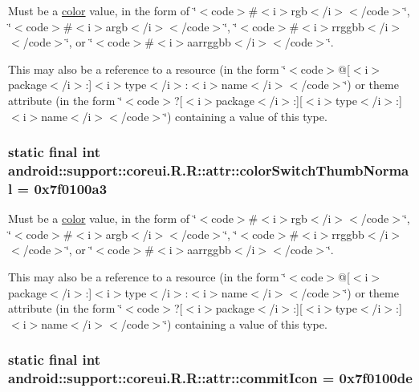 Must be a \hyperlink{classandroid_1_1support_1_1coreui_1_1_r_1_1color}{color} value, in the form of \char`\"{}$<$code$>$\#$<$i$>$rgb$<$/i$>$$<$/code$>$\char`\"{}, \char`\"{}$<$code$>$\#$<$i$>$argb$<$/i$>$$<$/code$>$\char`\"{}, \char`\"{}$<$code$>$\#$<$i$>$rrggbb$<$/i$>$$<$/code$>$\char`\"{}, or \char`\"{}$<$code$>$\#$<$i$>$aarrggbb$<$/i$>$$<$/code$>$\char`\"{}. 

This may also be a reference to a resource (in the form \char`\"{}$<$code$>$@\mbox{[}$<$i$>$package$<$/i$>$:\mbox{]}$<$i$>$type$<$/i$>$:$<$i$>$name$<$/i$>$$<$/code$>$\char`\"{}) or theme attribute (in the form \char`\"{}$<$code$>$?\mbox{[}$<$i$>$package$<$/i$>$:\mbox{]}\mbox{[}$<$i$>$type$<$/i$>$:\mbox{]}$<$i$>$name$<$/i$>$$<$/code$>$\char`\"{}) containing a value of this type. \hypertarget{classandroid_1_1support_1_1coreui_1_1_r_1_1attr_802857b72cbbbf709e4a771bb2261709}{
\subsubsection[{colorSwitchThumbNormal}]{\setlength{\rightskip}{0pt plus 5cm}static final int android::support::coreui.R.R::attr::colorSwitchThumbNormal = 0x7f0100a3}}
\label{classandroid_1_1support_1_1coreui_1_1_r_1_1attr_802857b72cbbbf709e4a771bb2261709}


Must be a \hyperlink{classandroid_1_1support_1_1coreui_1_1_r_1_1color}{color} value, in the form of \char`\"{}$<$code$>$\#$<$i$>$rgb$<$/i$>$$<$/code$>$\char`\"{}, \char`\"{}$<$code$>$\#$<$i$>$argb$<$/i$>$$<$/code$>$\char`\"{}, \char`\"{}$<$code$>$\#$<$i$>$rrggbb$<$/i$>$$<$/code$>$\char`\"{}, or \char`\"{}$<$code$>$\#$<$i$>$aarrggbb$<$/i$>$$<$/code$>$\char`\"{}. 

This may also be a reference to a resource (in the form \char`\"{}$<$code$>$@\mbox{[}$<$i$>$package$<$/i$>$:\mbox{]}$<$i$>$type$<$/i$>$:$<$i$>$name$<$/i$>$$<$/code$>$\char`\"{}) or theme attribute (in the form \char`\"{}$<$code$>$?\mbox{[}$<$i$>$package$<$/i$>$:\mbox{]}\mbox{[}$<$i$>$type$<$/i$>$:\mbox{]}$<$i$>$name$<$/i$>$$<$/code$>$\char`\"{}) containing a value of this type. \hypertarget{classandroid_1_1support_1_1coreui_1_1_r_1_1attr_edc92c0dd490ca90870fc3612971d9a0}{
\subsubsection[{commitIcon}]{\setlength{\rightskip}{0pt plus 5cm}static final int android::support::coreui.R.R::attr::commitIcon = 0x7f0100de}}
\label{classandroid_1_1support_1_1coreui_1_1_r_1_1attr_edc92c0dd490ca90870fc3612971d9a0}


